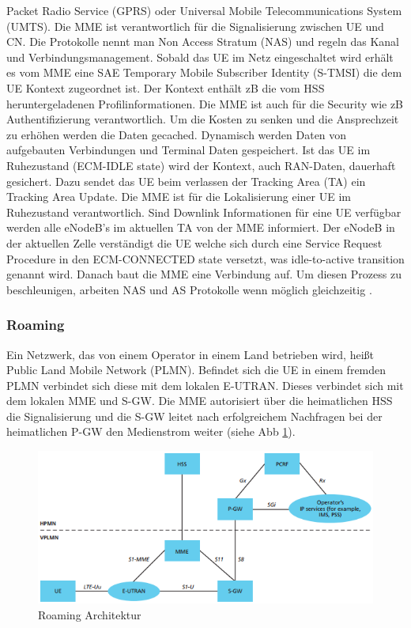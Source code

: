 Packet Radio Service (GPRS) oder Universal Mobile Telecommunications System (UMTS). Die MME ist verantwortlich für die Signalisierung zwischen UE und CN. Die Protokolle nennt man Non Access Stratum (NAS) und regeln das Kanal und Verbindungsmanagement. Sobald das UE im Netz eingeschaltet wird erhält es vom MME eine SAE Temporary Mobile Subscriber Identity (S-TMSI) die dem UE Kontext zugeordnet ist. Der Kontext enthält zB die vom HSS heruntergeladenen Profilinformationen. Die MME ist auch für die Security wie zB Authentifizierung verantwortlich. Um die Kosten zu senken und die Ansprechzeit zu erhöhen werden die Daten gecached. Dynamisch werden Daten von aufgebauten Verbindungen und Terminal Daten gespeichert. Ist das UE im Ruhezustand (ECM-IDLE state) wird der Kontext, auch RAN-Daten, dauerhaft gesichert. Dazu sendet das UE beim verlassen der Tracking Area (TA) ein Tracking Area Update. Die MME ist für die Lokalisierung einer UE im Ruhezustand verantwortlich. Sind Downlink Informationen für eine UE verfügbar werden alle eNodeB's im aktuellen TA von der MME informiert. Der eNodeB in der aktuellen Zelle verständigt die UE welche sich durch eine Service Request Procedure in den ECM-CONNECTED state versetzt, was idle-to-active transition genannt wird. Danach baut die MME eine Verbindung auf. Um diesen Prozess zu beschleunigen, arbeiten NAS und AS Protokolle wenn möglich gleichzeitig \cite{Ses11}.

\subsubsection{Roaming}
\label{subsubsec:etxterne}
Ein Netzwerk, das von einem Operator in einem Land betrieben wird, heißt Public Land Mobile Network (PLMN). Befindet sich die UE in einem fremden PLMN verbindet sich diese mit dem lokalen E-UTRAN. Dieses verbindet sich mit dem lokalen MME und S-GW. Die MME autorisiert über die heimatlichen HSS die Signalisierung und die S-GW leitet nach erfolgreichem Nachfragen bei der heimatlichen P-GW den Medienstrom weiter (siehe%
Abb \ref{fig:roaming}\cite{Ses11}).
\begin{figure}[H]
	\centering
	\includegraphics[width=1\linewidth]{images/Roaming}
	\caption{Roaming Architektur \protect\cite{Ses11}}
	\label{fig:roaming}
\end{figure}

